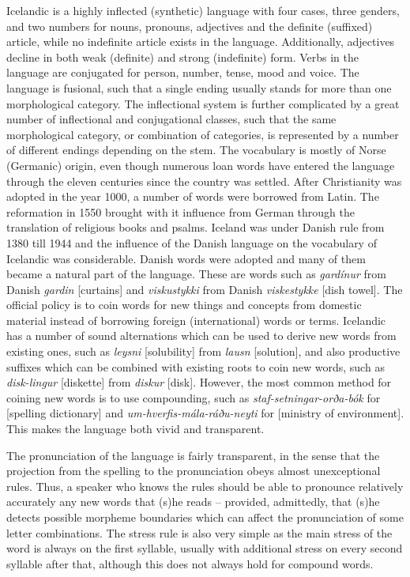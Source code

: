 \begin{multicols}{2}
Icelandic is a highly inflected (synthetic) language with four cases, three genders, and two numbers for nouns, pronouns, adjectives and the definite (suffixed) article, while no indefinite article exists in the language. Additionally, adjectives decline in both weak (definite) and strong (indefinite) form. Verbs in the language are conjugated for person, number, tense, mood and voice. The language is fusional, such that a single ending usually stands for more than one morphological category. The inflectional system is further complicated by a great number of inflectional and conjugational classes, such that the same morphological category, or combination of categories, is represented by a number of different endings depending on the stem.
The vocabulary is mostly of Norse (Germanic) origin, even though numerous loan words have entered the language through the eleven centuries since the country was settled. After Christianity was adopted in the year 1000, a number of words were borrowed from Latin. The reformation in 1550 brought with it influence from German through the translation of religious books and psalms. Iceland was under Danish rule from 1380 till 1944 and the influence of the Danish language on the vocabulary of Icelandic was considerable. Danish words were adopted and many of them became a natural part of the language. These are words such as \textit{gardínur} from Danish \textit{gardin} {[}curtains{]} and \textit{viskustykki} from Danish \textit{viskestykke} {[}dish towel{]}.
The official policy is to coin words for new things and concepts from domestic material instead of borrowing foreign (international) words or terms. Icelandic has a number of sound alternations which can be used to derive new words from existing ones, such as \textit{leysni} {[}solubility{]} from \textit{lausn} {[}solution{]}, and also productive suffixes which can be combined with existing roots to coin new words, such as \textit{disk-lingur} {[}diskette{]} from \textit{diskur} {[}disk{]}. However, the most common method for coining new words is to use compounding, such as \textit{staf-setningar-orða-bók} for {[}spelling dictionary{]} and \textit{um-hverfis-mála-ráðu-neyti} for {[}ministry of environment{]}. This makes the language both vivid and transparent.

The pronunciation of the language is fairly transparent, in the sense that the projection from the spelling to the pronunciation obeys almost unexceptional rules. Thus, a speaker who knows the rules should be able to pronounce relatively accurately any new words that (s)he reads -- provided, admittedly, that (s)he detects possible morpheme boundaries which can affect the pronunciation of some letter combinations. The stress rule is also very simple as the main stress of the word is always on the first syllable, usually with additional stress on every second syllable after that, although this does not always hold for compound words. 


\end{multicols}
